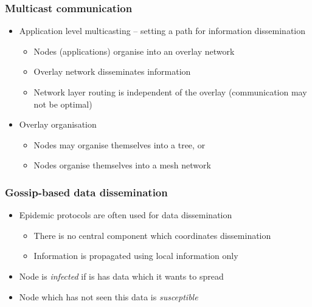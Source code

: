 \subsubsection{Multicast communication}
\begin{itemize}
	\item Application level multicasting -- setting a path for information dissemination
	\begin{itemize}
		\item Nodes (applications) organise into an overlay network
		\item Overlay network disseminates information
		\item Network layer routing is independent of the overlay (communication may not be optimal)
	\end{itemize}
	\item Overlay organisation
	\begin{itemize}
		\item Nodes may organise themselves into a tree, or
		\item Nodes organise themselves into a mesh network
	\end{itemize}
\end{itemize}

\subsubsection{Gossip-based data dissemination}
\begin{itemize}
	\item Epidemic protocols are often used for data dissemination
	\begin{itemize}
		\item There is no central component which coordinates dissemination
		\item Information is propagated using local information only
	\end{itemize}
	\item Node is \textit{infected} if is has data which it wants to spread
	\item Node which has not seen this data is \textit{susceptible}	
\end{itemize}

